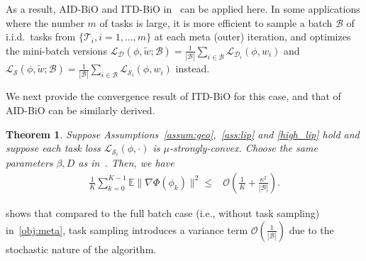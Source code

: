 \documentclass{osudissert96}
\def\gB{{\mathcal{B}}}
\def\gD{{\mathcal{D}}}
\def\gL{{\mathcal{L}}}
\def\gS{{\mathcal{S}}}
\newtheorem{theorem}{Theorem}
\begin{document}
 As a result,  AID-BiO and ITD-BiO in~ can be applied here.  
In some applications where the number $m$ of tasks is large,  it is more efficient to sample a batch $\gB$ of i.i.d.\ tasks from $\{\mathcal{T}_i,i=1,...,m\}$ at each meta (outer) iteration, and optimizes the mini-batch versions $ \gL_{\gD} (\phi,\widetilde w;\gB) = \frac{1}{|\gB|}\sum_{i\in\gB}\gL_{\gD_i}(\phi,w_i)$ and $\gL_{\gS} (\phi,\widetilde w;\gB)=\frac{1}{|\gB|}\sum_{i\in\gB}\gL_{\gS_i}(\phi,w_i)$ instead. 

We next  provide the convergence result of ITD-BiO for this case, and that of AID-BiO can be similarly derived.
\begin{theorem}\label{th:meta_learning}
Suppose Assumptions~\ref{assum:geo},~\ref{ass:lip} and \ref{high_lip} hold and suppose each task loss $\gL_{\gS_i}(\phi,\cdot)$ is $\mu$-strongly-convex. Choose the same parameters $\beta,D$ as in~. Then, we have
\begin{align*}
\frac{1}{K}\sum_{k=0}^{K-1}\mathbb{E}\| \nabla \Phi(\phi_k)\|^2 \leq& \mathcal{O} \left(\frac{1}{K}+\frac{\kappa^2}{|\gB|}\right).
\end{align*}
\end{theorem}
  shows  that compared to the full batch case (i.e., without task sampling) in~\cref{obj:meta}, task sampling introduces a variance term $\mathcal{O}(\frac{1}{|\gB|})$ due to the stochastic nature of the algorithm.  
\end{document}
